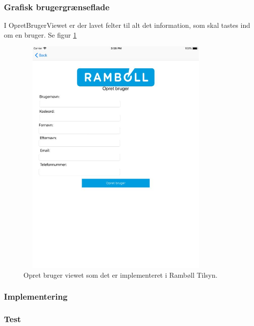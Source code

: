 \subsubsection{Grafisk brugergrænseflade}
I OpretBrugerViewet er der lavet felter til alt det information, som skal tastes ind om en bruger. Se figur \ref{fig:OpretBrugerView}
\begin{figure}[H] %
	\centering
	\includegraphics[height=12cm, width=10cm]{Design/Applikation/OpretBruger/OpretBrugerView}
	\caption{Opret bruger viewet som det er implementeret i Rambøll Tilsyn.}
	\label{fig:OpretBrugerView}
\end{figure}

\subsubsection{Implementering}

\subsubsection{Test}

\clearpage